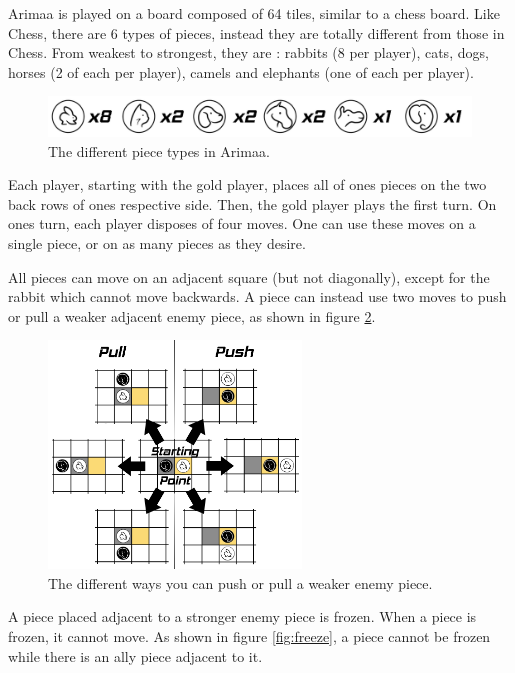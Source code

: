 Arimaa is played on a board composed of 64 tiles, similar to a chess board. Like Chess, there are 6 types of pieces, instead they are totally different from those in Chess. From weakest to strongest, they are : rabbits (8 per player), cats, dogs, horses (2 of each per player), camels and elephants (one of each per player).%

\begin{figure}[!h]
\centering
\includegraphics[width=\textwidth]{1_Presentation/1.1_Arimaa_rules_Gabriel/Pictures/Pieces.png}
\caption{The different piece types in Arimaa.}
\label{fig:pieces}
\end{figure}

Each player, starting with the gold player, places all of ones pieces on the two back rows of ones respective side. Then, the gold player plays the first turn.
On ones turn, each player disposes of four moves. One can use these moves on a single piece, or on as many pieces as they desire.

All pieces can move on an adjacent square (but not diagonally), except for the rabbit which cannot move backwards.
A piece can instead use two moves to push or pull a weaker adjacent enemy piece, as shown in figure \ref{fig:displace}.

\begin{figure}[!h]
\centering
\includegraphics[width=0.6\textwidth]{1_Presentation/1.1_Arimaa_rules_Gabriel/Pictures/Displace.png}
\caption{The different ways you can push or pull a weaker enemy piece.}
\label{fig:displace}
\end{figure}

A piece placed adjacent to a stronger enemy piece is frozen. When a piece is frozen, it cannot move. As shown in figure \ref{fig:freeze}, a piece cannot be frozen while there is an ally piece adjacent to it.

